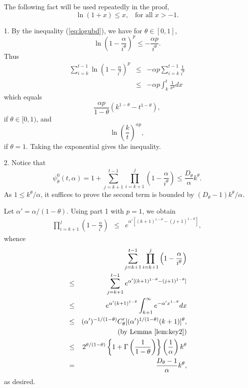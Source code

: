 \documentclass[twoside,twocolumn,journal]{IEEEtran}
\newenvironment{pf}[1][Proof]{\medskip\noindent\hspace{1em}{\itshape #1: }}{\hspace*{\fill}~\QED\par\endtrivlist\medskip}
\begin{document}
\begin{pf}
The following fact will be used repeatedly in the proof,
\begin{equation}\label{eq:logubd}
\ln (1+x) \leq x, \ \ \ \ \mbox{for all $x>-1$}.
\end{equation}

1. By the inequality (\ref{eq:logubd}), we have for $\theta \in [0,1]$,
\[ \ln \left(1 - \frac{\alpha}{i^\theta}\right)^p \leq -\frac{\alpha p}{i^\theta}. \]
Thus
\begin{eqnarray*}
\sum_{i=k}^{t-1} \ln \left( 1-\frac{\alpha}{i^\theta} \right)^p & \leq & - \alpha p \sum_{i=k}^{t-1} \frac{1}{i^\theta} \\
 & \leq & -\alpha p\int_{k}^{t} \frac{1}{x^\theta} d x
\end{eqnarray*}
which equals
\[\frac{\alpha p}{1-\theta} \left(k^{1-\theta}-t^{1-\theta} \right), \]
if $\theta\in [0,1)$, and
\[ \ln \left(\frac{k}{t}\right)^{\alpha p}, \]
if $\theta=1$. Taking the exponential gives the inequality.

2. Notice that
\[ \psi^0_\theta(t,\alpha)=1+ \sum_{j=k+1}^{t-1} \prod_{i=k+1}^j \left(1 - \frac{\alpha}{i^\theta} \right)
\leq \frac{D_\theta}{\alpha} k^{\theta}. \]
As $1\leq k^\theta/\alpha$, it suffices to prove the second term is bounded by $(D_{\theta}-1)k^\theta/\alpha$.

Let $\alpha'=\alpha/(1-\theta)$. Using part 1 with $p=1$, we obtain
\begin{eqnarray*}
\prod_{i=k+1}^j \left(1 - \frac{\alpha}{i^\theta} \right) & \leq &  e^{\alpha'[(k+1)^{1-\theta} - (j+1)^{1-\theta}]},
\end{eqnarray*}
whence
\begin{eqnarray*}
& & \sum_{j=k+1}^{t-1} \prod_{i=k+1}^j \left(1 - \frac{\alpha}{i^\theta} \right) \\
& \leq & \sum_{j=k+1}^{t-1} e^{\alpha'[(k+1)^{1-\theta} - (j+1)^{1-\theta}]} \\
& \leq & e^{\alpha'(k+1)^{1-\theta}}\int_{k+1}^\infty e^{- \alpha' x^{1-\theta}} d x \\
& \leq & (\alpha')^{-1/(1-\theta)} C_\theta' [(\alpha')^{1/(1-\theta)} (k+1)]^{\theta}, \\
& & \ \ \ \ \ \mbox{(by Lemma \ref{lem:key2})} \\
& \leq & 2^{\theta/(1-\theta)} \left\{ 1+\Gamma\left(\frac{1}{1-\theta}\right)\right\} \left(\frac{1}{\alpha}\right)k^\theta \\
& = & \frac{D_\theta-1}{\alpha} k^\theta,
\end{eqnarray*}
as desired.


\end{pf}
\end{document}
